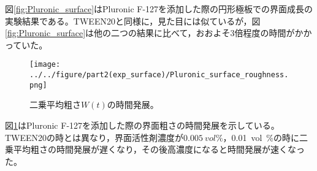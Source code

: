 \documentclass[autodetect-engine,dvi=dvipdfmx,a4paper,ja=standard,oneside,openany,11pt]{bxjsbook}
\begin{document}
図\ref{fig:Pluronic_surface}はPluronic F-127を添加した際の円形極板での界面成長の実験結果である。TWEEN20と同様に，見た目には似ているが，図\ref{fig:Pluronic_surface}は他の二つの結果に比べて，おおよそ3倍程度の時間がかかっていた。

\begin{figure}[htbp]
  \centering
  \texttt{[image: ../../figure/part2(exp\_surface)/Pluronic\_surface\_roughness.png]}
  \caption{二乗平均粗さ$W(t)$の時間発展。}
  \label{fig:surface_roughness_Pluronic}
\end{figure}

図\ref{fig:surface_roughness_Pluronic}はPluronic F-127を添加した際の界面粗さの時間発展を示している。TWEEN20の時とは異なり，界面活性剤濃度が$\SI{0.005}{vol\%}，$\SI{0.01}{vol\%}の時に二乗平均粗さの時間発展が遅くなり，その後高濃度になると時間発展が速くなった。

\ifdraft{
  
  
}{}
\end{document}
